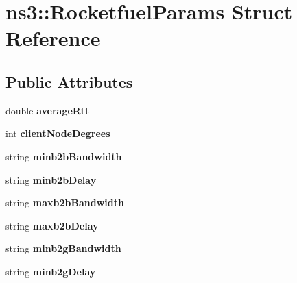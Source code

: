 \hypertarget{structns3_1_1RocketfuelParams}{}\section{ns3\+:\+:Rocketfuel\+Params Struct Reference}
\label{structns3_1_1RocketfuelParams}
\subsection*{Public Attributes}
\begin{DoxyCompactItemize}
\item 
double {\bfseries average\+Rtt}\hypertarget{structns3_1_1RocketfuelParams_a60459e48582d3059a1de7fab42275c2e}{}\label{structns3_1_1RocketfuelParams_a60459e48582d3059a1de7fab42275c2e}

\item 
int {\bfseries client\+Node\+Degrees}\hypertarget{structns3_1_1RocketfuelParams_a45bff05e62ee9358bd68cb12d66d62e3}{}\label{structns3_1_1RocketfuelParams_a45bff05e62ee9358bd68cb12d66d62e3}

\item 
string {\bfseries minb2b\+Bandwidth}\hypertarget{structns3_1_1RocketfuelParams_a66ab76d9b396adbb280c108f9fa6b824}{}\label{structns3_1_1RocketfuelParams_a66ab76d9b396adbb280c108f9fa6b824}

\item 
string {\bfseries minb2b\+Delay}\hypertarget{structns3_1_1RocketfuelParams_a9d795b99c295f1245f7af08ead59556b}{}\label{structns3_1_1RocketfuelParams_a9d795b99c295f1245f7af08ead59556b}

\item 
string {\bfseries maxb2b\+Bandwidth}\hypertarget{structns3_1_1RocketfuelParams_a33d1bcf96c23f52bce0995e5ff96c997}{}\label{structns3_1_1RocketfuelParams_a33d1bcf96c23f52bce0995e5ff96c997}

\item 
string {\bfseries maxb2b\+Delay}\hypertarget{structns3_1_1RocketfuelParams_a4c038d276cf7bb2ab3c8b4bc51a3ecfe}{}\label{structns3_1_1RocketfuelParams_a4c038d276cf7bb2ab3c8b4bc51a3ecfe}

\item 
string {\bfseries minb2g\+Bandwidth}\hypertarget{structns3_1_1RocketfuelParams_a100986f645a507430c138983e5c54e0b}{}\label{structns3_1_1RocketfuelParams_a100986f645a507430c138983e5c54e0b}

\item 
string {\bfseries minb2g\+Delay}\hypertarget{structns3_1_1RocketfuelParams_accaf085bf39e435c1cd57844cb468afc}{}\label{structns3_1_1RocketfuelParams_accaf085bf39e435c1cd57844cb468afc}


\end{DoxyCompactItemize}
